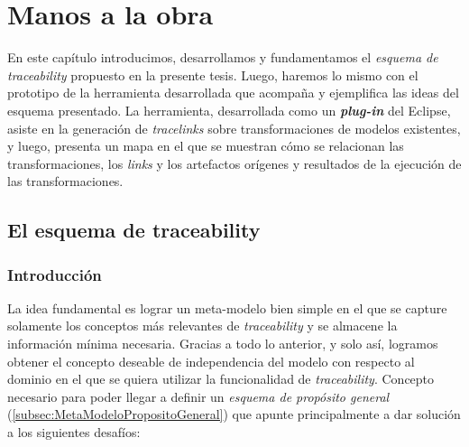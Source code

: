 \documentclass[a4paper,12pt,oneside,spanish]{book}
\begin{document}
\chapter{Manos a la obra}
\label{cap:Propuesta}

En este capítulo introducimos, desarrollamos y fundamentamos el \textit{esquema de
traceability} propuesto en la presente tesis. Luego, haremos lo mismo con el prototipo de la herramienta desarrollada que acompaña y ejemplifica las ideas del esquema presentado. 
La herramienta, desarrollada como un \textit{\textbf{plug-in}} del  Eclipse, asiste en la generación de \textit{tracelinks} sobre transformaciones de modelos existentes, y luego, presenta un mapa en el que se muestran cómo se relacionan las transformaciones, los \textit{links} y los artefactos orígenes y resultados de la ejecución de las transformaciones.



\section{El esquema de traceability}


\subsection{Introducción}
\label{sec:EsquemaPropIntro}

La idea fundamental es lograr un meta-modelo bien simple en el que se capture solamente los conceptos más relevantes de \textit{traceability} y se almacene la información mínima necesaria. Gracias a todo lo anterior, y solo así, logramos obtener el concepto deseable de independencia del modelo con respecto al dominio en el que se quiera utilizar la funcionalidad de \textit{traceability}. Concepto necesario para poder llegar a definir un \textit{esquema de propósito general} (\ref{subsec:MetaModeloPropositoGeneral}) que apunte principalmente a dar solución a los siguientes desafíos:
\end{document}
